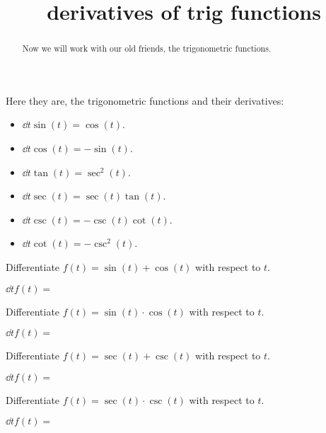 \documentclass{ximera}
\title{derivatives of trig functions}
\begin{document}
\begin{abstract}
  Now we will work with our old friends, the trigonometric functions. 
\end{abstract}
\maketitle

Here they are, the trigonometric functions and their derivatives:


\begin{theorem} \hfil
\begin{itemize}
\item $\dd{t} \sin(t) = \cos(t)$.
\item $\dd{t} \cos(t) = -\sin(t)$.
\item $\dd{t} \tan(t) = \sec^2(t)$.
\item $\dd{t} \sec(t) = \sec(t)\tan(t)$.
\item $\dd{t} \csc(t) = -\csc(t)\cot(t)$.
\item $\dd{t} \cot(t) = -\csc^2(t)$.
\end{itemize}
\end{theorem}


\begin{question}
  Differentiate $f(t) = \sin(t) + \cos(t)$ with respect to $t$.
  \begin{prompt}
    $\dd{t} f(t) = $
  \end{prompt}
\end{question}

\begin{question}
  Differentiate $f(t) = \sin(t)\cdot\cos(t)$ with respect to $t$.
  \begin{prompt}
    $\dd{t} f(t) = $
  \end{prompt}
\end{question}


\begin{question}
  Differentiate $f(t) = \sec(t) + \csc(t)$ with respect to $t$.
  \begin{prompt}
    $\dd{t} f(t) = $
  \end{prompt}
\end{question}

\begin{question}
  Differentiate $f(t) = \sec(t)\cdot\csc(t)$ with respect to $t$.
  \begin{prompt}
    $\dd{t} f(t) = $
  \end{prompt}
\end{question}
\end{document}
